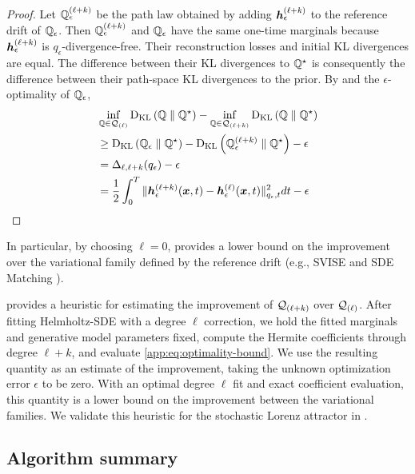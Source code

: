 \begin{proof}
Let $\mathbb{Q}_\epsilon^{(\ell + k)}$ be the path law obtained by adding $\boldsymbol{h}_\epsilon^{(\ell + k)}$ to the reference drift of $\mathbb{Q}_\epsilon$.
Then $\mathbb{Q}_\epsilon^{(\ell + k)}$ and $\mathbb{Q}_\epsilon$ have the same one-time marginals because $\boldsymbol{h}_\epsilon^{(\ell + k)}$ is $q_\epsilon$-divergence-free.
Their reconstruction losses and initial KL divergences are equal.
The difference between their KL divergences to $\mathbb{Q}^\star$ is consequently the difference between their path-space KL divergences to the prior.
By  and the $\epsilon$-optimality of $\mathbb{Q}_\epsilon$,
\begin{equation*}
\begin{aligned}
&\inf_{\mathbb{Q}\in\mathcal{Q}_{(\ell)}}\textrm{D}_{\textrm{KL}}\left(\mathbb{Q}\;\|\;\mathbb{Q}^\star\right)-\inf_{\mathbb{Q}\in\mathcal{Q}_{(\ell + k)}}\textrm{D}_{\textrm{KL}}\left(\mathbb{Q}\;\|\;\mathbb{Q}^\star\right)\\
&\geq\textrm{D}_{\textrm{KL}}\left(\mathbb{Q}_\epsilon\;\|\;\mathbb{Q}^\star\right)-\textrm{D}_{\textrm{KL}}\left(\mathbb{Q}_\epsilon^{(\ell + k)}\;\|\;\mathbb{Q}^\star\right)-\epsilon\\
&= \Delta_{\ell,\ell+k}(q_\epsilon) -\epsilon\\
&=\frac{1}{2}\int_0^T\|\boldsymbol{h}_\epsilon^{(\ell + k)}(\boldsymbol{x},t) - \boldsymbol{h}_\epsilon^{(\ell)}(\boldsymbol{x},t)\|_{q_\epsilon,t}^2dt-\epsilon
\end{aligned}
\end{equation*}
\end{proof}
In particular, by choosing $\ell = 0$,  provides a lower bound on the improvement over the variational family defined by the reference drift (e.g., SVISE \cite{course2023state,course2023amortized} and SDE Matching \cite{bartosh2025sde}).


 provides a heuristic for estimating the improvement of $\mathcal{Q}_{(\ell + k)}$ over $\mathcal{Q}_{(\ell)}$.
After fitting Helmholtz-SDE with a degree $\ell$ correction, we hold the fitted marginals and generative model parameters fixed, compute the Hermite coefficients through degree $\ell+k$, and evaluate \cref{app:eq:optimality-bound}.
We use the resulting
quantity as an estimate of the improvement, taking the unknown
optimization error $\epsilon$ to be zero.
With an optimal degree $\ell$ fit and exact coefficient evaluation, this quantity is a lower bound on the improvement between the  variational families.
We validate this heuristic for the stochastic Lorenz attractor in .

\subsection{Algorithm summary}
\label{app:subsec:alg-summary}

